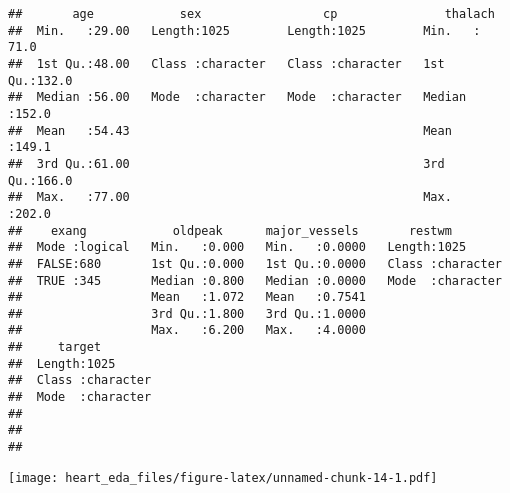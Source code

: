 \documentclass[
]{article}
\newenvironment{Shaded}{\begin{snugshade}}{\end{snugshade}}
\newcommand{\AttributeTok}[1]{\textcolor[rgb]{0.77,0.63,0.00}{#1}}
\newcommand{\ConstantTok}[1]{\textcolor[rgb]{0.00,0.00,0.00}{#1}}
\newcommand{\FunctionTok}[1]{\textcolor[rgb]{0.00,0.00,0.00}{#1}}
\newcommand{\NormalTok}[1]{#1}
\newcommand{\SpecialCharTok}[1]{\textcolor[rgb]{0.00,0.00,0.00}{#1}}
\newcommand{\StringTok}[1]{\textcolor[rgb]{0.31,0.60,0.02}{#1}}
\begin{document}
\begin{verbatim}
##       age            sex                 cp               thalach     
##  Min.   :29.00   Length:1025        Length:1025        Min.   : 71.0  
##  1st Qu.:48.00   Class :character   Class :character   1st Qu.:132.0  
##  Median :56.00   Mode  :character   Mode  :character   Median :152.0  
##  Mean   :54.43                                         Mean   :149.1  
##  3rd Qu.:61.00                                         3rd Qu.:166.0  
##  Max.   :77.00                                         Max.   :202.0  
##    exang            oldpeak      major_vessels       restwm         
##  Mode :logical   Min.   :0.000   Min.   :0.0000   Length:1025       
##  FALSE:680       1st Qu.:0.000   1st Qu.:0.0000   Class :character  
##  TRUE :345       Median :0.800   Median :0.0000   Mode  :character  
##                  Mean   :1.072   Mean   :0.7541                     
##                  3rd Qu.:1.800   3rd Qu.:1.0000                     
##                  Max.   :6.200   Max.   :4.0000                     
##     target         
##  Length:1025       
##  Class :character  
##  Mode  :character  
##                    
##                    
## 
\end{verbatim}

\begin{Shaded}
\end{Shaded}

\texttt{[image: heart\_eda\_files/figure-latex/unnamed-chunk-14-1.pdf]}
\end{document}
